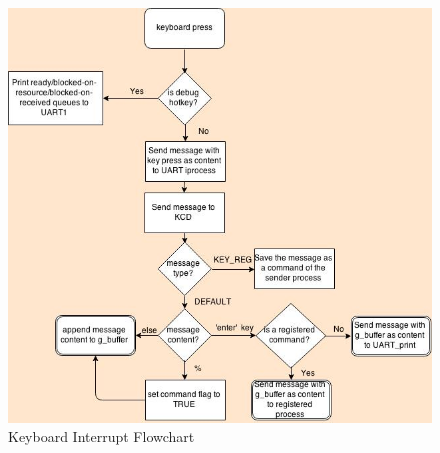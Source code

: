\documentclass[11pt, oneside]{article}
\begin{document}
\begin{figure}[ht!]
\centering
\includegraphics[width=150mm]{Keyboard_interrupt.jpg}
\caption{Keyboard Interrupt Flowchart \label{overflow}}
\end{figure}
\end{document}
